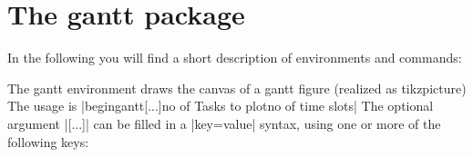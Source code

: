 \begin{fullwidth}
\begin{gantt}[xunitlength=\ganttscale{0.25cm},  fontsize=\footnotesize, drawledgerline=false]{\linesdeep}{\monthstoplot}
\begin{ganttitle}
\setcounter{monthcount}{1}
  {%
   \mon{\themonthcount}%
  }
 
\end{ganttitle}

\begin{ganttitle}
   \setcounter{weekcount}{1}
  {%
   \mon{\theweekcount}%
  }      
\end{ganttitle}
 
\xdef\prop{color=orange}

\end{gantt}

\end{fullwidth}



   
\section{The gantt package}

In the following you will find a short description of environments and commands: 

The gantt environment draws the canvas of a gantt figure (realized as tikzpicture)
The usage is |begin{gantt}[...]{no of Tasks to plot}{no of time slots}|
The optional argument |[...]| can be filled in a |key=value| syntax, using one or more of the following keys:

